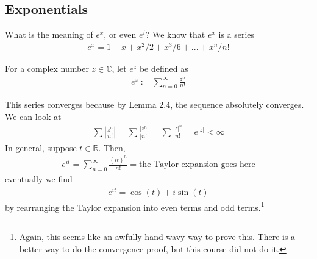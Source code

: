 \subsection{Exponentials}
What is the meaning of $e^x$, or even $e^i$? We know that $e^x$ is a series
\begin{align}
    e^x = 1 + x + x^2/2 + x^3/6 + ... + x^n/n!
\end{align}
\begin{definition}
    For a complex number $z \in \mathbb{C}$, let $e^z$ be defined as
    \begin{align}
        e^z := \sum_{n=0}^\infty \frac{z^n}{n!}
    \end{align}
\end{definition}
This series converges because by Lemma 2.4, the sequence absolutely converges. We can look at
\begin{align}
    \sum |\frac{z^n}{n!}| = \sum \frac{|z^n|}{|n!|} = \sum \frac{|z|^n}{n!} = e^{|z|} < \infty
\end{align}
In general, suppose $t \in \mathbb{R}$. Then,
\begin{align}
    e^{it} = \sum_{n=0}^\infty \frac{(it)^n}{n!} = \text{the Taylor expansion goes here}
\end{align}
eventually we find
\begin{align}
    e^{it} = \cos(t) + i\sin(t)
\end{align}
by rearranging the Taylor expansion into even terms and odd terms.\footnote{Again, this seems like an awfully hand-wavy way to prove this. There is a better way to do the convergence proof, but this course did not do it.}